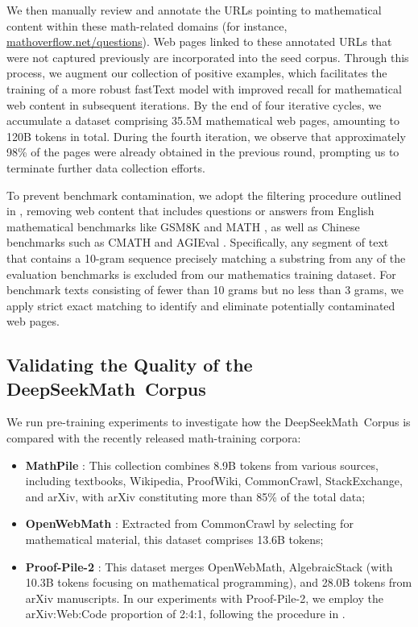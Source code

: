 \begin{itemize}[topsep=0pt]
We then manually review and annotate the URLs pointing to mathematical content within these math-related domains (for instance, \url{mathoverflow.net/questions}). Web pages linked to these annotated URLs that were not captured previously are incorporated into the seed corpus. Through this process, we augment our collection of positive examples, which facilitates the training of a more robust fastText model with improved recall for mathematical web content in subsequent iterations. By the end of four iterative cycles, we accumulate a dataset comprising 35.5M mathematical web pages, amounting to 120B tokens in total. During the fourth iteration, we observe that approximately 98\% of the pages were already obtained in the previous round, prompting us to terminate further data collection efforts.

To prevent benchmark contamination, we adopt the filtering procedure outlined in \cite{deepseek-coder}, removing web content that includes questions or answers from English mathematical benchmarks like GSM8K \citep{gsm8k} and MATH \citep{MATH}, as well as Chinese benchmarks such as CMATH \citep{wei2023cmath} and AGIEval \citep{agieval}. Specifically, any segment of text that contains a 10-gram sequence precisely matching a substring from any of the evaluation benchmarks is excluded from our mathematics training dataset. For benchmark texts consisting of fewer than 10 grams but no less than 3 grams, we apply strict exact matching to identify and eliminate potentially contaminated web pages.

\subsection{Validating the Quality of the DeepSeekMath~Corpus}

We run pre-training experiments to investigate how the DeepSeekMath~Corpus is compared with the recently released math-training corpora:

\begin{itemize}[topsep=0pt]
    \item \textbf{MathPile} \citep{mathpile}: This collection combines 8.9B tokens from various sources, including textbooks, Wikipedia, ProofWiki, CommonCrawl, StackExchange, and arXiv, with arXiv constituting more than 85\% of the total data;
    \item \textbf{OpenWebMath} \citep{openwebmath}: Extracted from CommonCrawl by selecting for mathematical material, this dataset comprises 13.6B tokens;
    \item \textbf{Proof-Pile-2} \citep{llemma}: This dataset merges OpenWebMath, AlgebraicStack (with 10.3B tokens focusing on mathematical programming), and 28.0B tokens from arXiv manuscripts. In our experiments with Proof-Pile-2, we employ the arXiv:Web:Code proportion of 2:4:1, following the procedure in \cite{llemma}.
\end{itemize}


\end{itemize}
